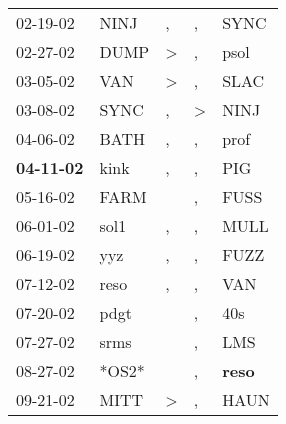 \begin{supertabular}{p{0.07\textwidth}p{0.06\textwidth}p{0.02\textwidth}p{0.02\textwidth}p{0.06\textwidth}}
          02-19-02\textsuperscript{} &           NINJ\textsuperscript{} &                , &                , &           SYNC\textsuperscript{} \\
          02-27-02\textsuperscript{} &           DUMP\textsuperscript{} &     \textgreater &                , &           psol\textsuperscript{} \\
          03-05-02\textsuperscript{} &            VAN\textsuperscript{} &     \textgreater &                , &           SLAC\textsuperscript{} \\
          03-08-02\textsuperscript{} &           SYNC\textsuperscript{} &                , &     \textgreater &           NINJ\textsuperscript{} \\
          04-06-02\textsuperscript{} &           BATH\textsuperscript{} &                , &                , &           prof\textsuperscript{} \\
 \textbf{04-11-02\textsuperscript{}} &           kink\textsuperscript{} &                , &                , &            PIG\textsuperscript{} \\
          05-16-02\textsuperscript{} &           FARM\textsuperscript{} &                  &                , &           FUSS\textsuperscript{} \\
          06-01-02\textsuperscript{} &           sol1\textsuperscript{} &                , &                , &           MULL\textsuperscript{} \\
          06-19-02\textsuperscript{} &            yyz\textsuperscript{} &                , &                , &           FUZZ\textsuperscript{} \\
          07-12-02\textsuperscript{} &           reso\textsuperscript{} &                , &                , &            VAN\textsuperscript{} \\
          07-20-02\textsuperscript{} &           pdgt\textsuperscript{} &                  &                , &            40s\textsuperscript{} \\
          07-27-02\textsuperscript{} &           srms\textsuperscript{} &                  &                , &            LMS\textsuperscript{} \\
          08-27-02\textsuperscript{} &                            *OS2* &                  &                , &  \textbf{reso\textsuperscript{}} \\
          09-21-02\textsuperscript{} &           MITT\textsuperscript{} &     \textgreater &                , &           HAUN\textsuperscript{} \\

\end{supertabular}
